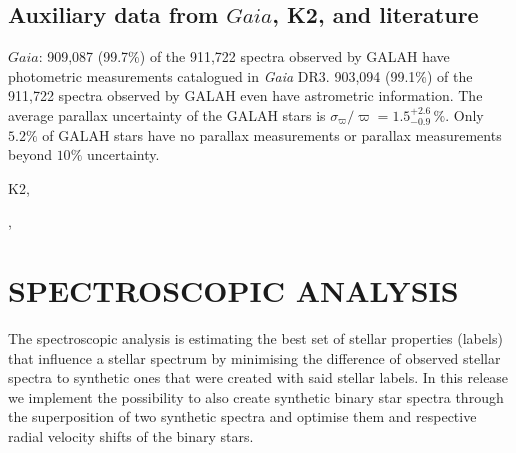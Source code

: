 \documentclass[
  journal=pasa,
  manuscript=research-paper, %
  year=2021,
  volume=37
]{cup-journal}
\newcommand{\Gaia}{\textit{Gaia}\xspace}
\begin{document}




\subsection{Auxiliary data from $Gaia$, K2, and literature} \label{sec:non-spec_data}

$Gaia$: 909,087 (99.7\%) of the 911,722 spectra observed by GALAH have photometric measurements catalogued in \Gaia DR3. 903,094 (99.1\%) of the 911,722 spectra observed by GALAH even have astrometric information. The average parallax uncertainty of the GALAH stars is $\sigma_{\varpi} / \varpi = 1.5_{-0.9}^{+2.6}\,\mathrm{\%}$. Only $5.2\%$ of GALAH stars have no parallax measurements or parallax measurements beyond $10\%$ uncertainty.


K2,

\citet{CantatGaudin2020}, 

\citet{Vasiliev2019b}


\section{SPECTROSCOPIC ANALYSIS}
\label{sec:spectroscopic_analysis}

The spectroscopic analysis is estimating the best set of stellar properties (labels) that influence a stellar spectrum by minimising the difference of observed stellar spectra to synthetic ones that were created with said stellar labels. In this release we implement the possibility to also create synthetic binary star spectra through the superposition of two synthetic spectra and optimise them and respective radial velocity shifts of the binary stars.
\end{document}
